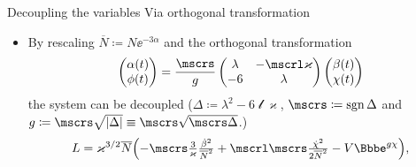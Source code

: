 \documentclass[8pt]{beamer}
\begin{document}
\begin{frame}%
{Decoupling the variables}%
{Via orthogonal transformation}
\begin{itemize}
\item By rescaling $\overline{N} \coloneqq N\ee^{-3\alpha}$ and
%
the orthogonal transformation
\begin{align}
\begin{pmatrix}
\rfun{\alpha}{t} \\ \rfun{\phi}{t}
\end{pmatrix} = \frac{\mscrs}{g}
\begin{pmatrix}
\lambda & -\mscrl\varkappa \\
-6 & \lambda
\end{pmatrix}
\begin{pmatrix}
\rfun{\beta}{t} \\ \rfun{\chi}{t}
\end{pmatrix}%
\end{align}
the system can be decoupled
($\Delta \coloneqq \lambda^2 - 6\mscrl\varkappa$,
\textcolor{blue}{$\mscrs \coloneqq \sgn \Delta$} and
$g \coloneqq \mscrs \sqrt{\vbr{\Delta}} \equiv \mscrs\sqrt{\mscrs\Delta}$.)
\begin{align}
L = \varkappa^{3/2}\overline{N}
\rbr{-\mscrs\tfrac{3}{\varkappa}\tfrac{\dot{\beta}^2}{\overline{N}^2}
+\mscrl\mscrs\tfrac{\dot{\chi}^2}{2\overline{N}^2}
-V\ee^{g \chi}},
\label{eq:lagrangian-decoupled}
\end{align}



\end{itemize}
\end{frame}
\end{document}
